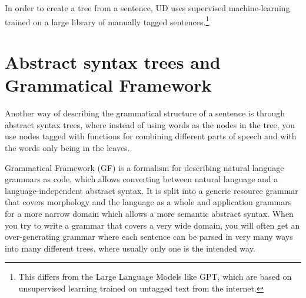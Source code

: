 In order to create a tree from a sentence, UD uses supervised machine-learning trained on a large library of manually tagged sentences.\footnote{This differs from the Large Language Models like GPT, which are based on unsupervised learning trained on untagged text from the internet.}










\section{Abstract syntax trees and Grammatical Framework}

Another way of describing the grammatical structure of a sentence is through abstract syntax trees, where instead of using words as the nodes in the tree, you use nodes tagged with functions for combining different parts of speech and with the words only being in the leaves.  


Grammatical Framework\cite{ranta-2004} (GF) is a formalism for describing natural language grammars as code, which allows converting between natural language and a language-independent abstract syntax. It is split into a generic resource grammar that covers morphology and the language as a whole and application grammars for a more narrow domain which allows a more semantic abstract syntax. When you try to write a grammar that covers a very wide domain, you will often get an over-generating grammar where each sentence can be parsed in very many ways into many different trees, where usually only one is the intended way.

